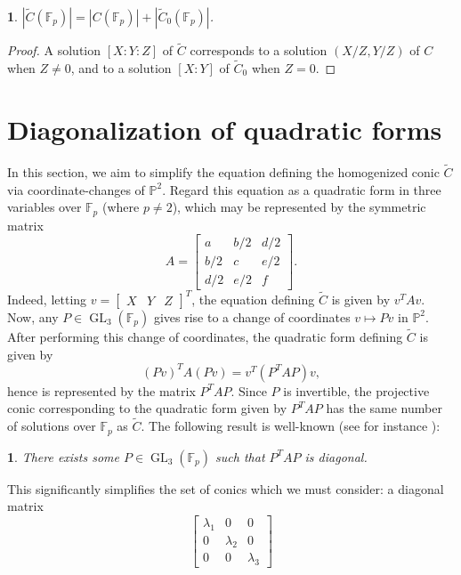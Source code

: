 \documentclass[10pt,a4paper]{amsart}
\numberwithin{equation}{section}
\numberwithin{figure}{section}
\theoremstyle{definition}
\theoremstyle{remark}
\theoremstyle{plain}
\newtheorem{thm}{\protect\theoremname}[section]
\theoremstyle{plain}
\theoremstyle{definition}
\theoremstyle{plain}
\theoremstyle{plain}
\newtheorem{lem}{\protect\lemmaname}[section]
\providecommand{\lemmaname}{Lemma}
\providecommand{\theoremname}{Theorem}
\renewcommand{\P}{\mathbb{P}}
\newcommand{\F}{\mathbb{F}}
\newcommand{\GL}{\operatorname{GL}}
\begin{document}
    \begin{lem} 
        $|\widetilde{C}(\F_p)| = |C(\F_p)| + |\widetilde{C}_0(\F_p)|$.
    \end{lem} 
    \begin{proof}
        A solution $[X:Y:Z]$ of $\widetilde{C}$ corresponds 
        to a solution $(X/Z,Y/Z)$ of $C$ when $Z \neq 0$,
        and to a solution $[X:Y]$ of $\widetilde{C}_0$ 
        when $Z = 0$.  
    \end{proof}

    \section{Diagonalization of quadratic forms}
    \label{sec:diagonalizing-quadratic-forms} 

    In this section, we aim to simplify the equation defining the homogenized conic $\widetilde{C}$ via coordinate-changes of $\P^2$. Regard this equation as a quadratic form in three variables over $\F_p$ (where $p\ne 2$), which may be represented by the symmetric matrix
	\begin{equation*}
	A=\begin{bmatrix}
	a&b/2&d/2\\
	b/2&c&e/2\\
	d/2&e/2&f
	\end{bmatrix}.
	\end{equation*}
	Indeed, letting $v=[\begin{matrix}X&Y&Z\end{matrix}]^T$, the equation defining $\widetilde{C}$ is given by $v^TAv$. Now, any $P\in\GL_3(\F_p)$ gives rise to a change of coordinates $v\mapsto Pv$ in $\P^2$. After performing this change of coordinates, the quadratic form defining $\widetilde{C}$ is given by
	\begin{equation*}
	(Pv)^TA(Pv)=v^T(P^TAP)v,
	\end{equation*}
	hence is represented by the matrix $P^TAP$. Since $P$ is invertible, the projective conic corresponding to the quadratic form given by $P^TAP$ has the same number of solutions over $\F_p$ as $\widetilde{C}$. The following result is well-known (see for instance \cite[Prop.~42:1]{omeara}):
	\begin{thm}
	\label{thm:diag}
	There exists some $P\in\GL_3(\F_p)$ such that $P^TAP$ is diagonal.
	\end{thm}
	This significantly simplifies the set of conics which we must consider: a diagonal matrix
	\begin{equation*}
	\begin{bmatrix}
	\lambda_1&0&0\\
	0&\lambda_2&0\\
	0&0&\lambda_3
	\end{bmatrix}
	\end{equation*}
\end{document}
